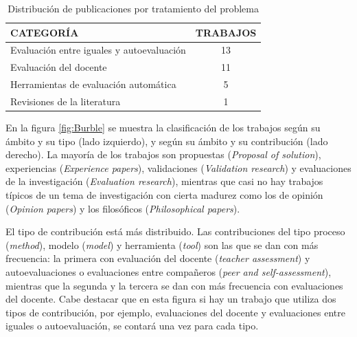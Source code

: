 \begin{table}
  \begin{center}
  \begin{tabular}{| m{10cm} | c |}
    \hline
    CATEGORÍA & TRABAJOS\\
    \hline
    \hline 
    Evaluación entre iguales y autoevaluación & 13\\
    \hline
    Evaluación del docente & 11\\
    \hline
    Herramientas de evaluación automática & 5\\
    \hline
    Revisiones de la literatura & 1\\
    \hline
  \end{tabular}
\end{center}
\caption{Distribución de publicaciones por tratamiento del problema}
\label{tab:PublicacionesForum}
\end{table} 


En la figura \ref{fig:Burble} se muestra la clasificación de los trabajos según su ámbito y su tipo (lado izquierdo), y según su ámbito y su contribución (lado derecho). La mayoría de los trabajos son propuestas (\emph{Proposal of solution}), experiencias (\emph{Experience papers}), validaciones (\emph{Validation research}) y evaluaciones de la investigación (\emph{Evaluation research}), mientras que casi no hay trabajos típicos de un tema de investigación con cierta madurez como los de opinión (\emph{Opinion papers}) y los filosóficos (\emph{Philosophical papers}). %

El tipo de contribución está más distribuido. Las contribuciones del tipo proceso (\emph{method}), modelo (\emph{model}) y herramienta (\emph{tool}) son las que se dan con más frecuencia: la primera con evaluación del docente (\emph{teacher assessment}) y autoevaluaciones o evaluaciones entre compañeros (\emph{peer and self-assessment}), mientras que la segunda y la tercera se dan con más frecuencia con evaluaciones del docente. Cabe destacar que en esta figura si hay un trabajo que utiliza dos tipos de contribución, por ejemplo, evaluaciones del docente y evaluaciones entre iguales o autoevaluación, se contará una vez para cada tipo.


